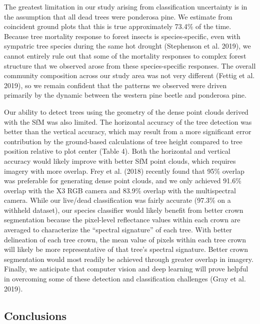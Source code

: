 \documentclass[]{article}
\begin{document}
The greatest limitation in our study arising from classification
uncertainty is in the assumption that all dead trees were ponderosa
pine. We estimate from coincident ground plots that this is true
approximately 73.4\% of the time. Because tree mortality response to
forest insects is species-specific, even with sympatric tree species
during the same hot drought (Stephenson et al. 2019), we cannot entirely
rule out that some of the mortality responses to complex forest
structure that we observed arose from these species-specific responses.
The overall community composition across our study area was not very
different (Fettig et al. 2019), so we remain confident that the patterns
we observed were driven primarily by the dynamic between the western
pine beetle and ponderosa pine.

Our ability to detect trees using the geometry of the dense point clouds
derived with the SfM was also limited. The horizontal accuracy of the
tree detection was better than the vertical accuracy, which may result
from a more significant error contribution by the ground-based
calculations of tree height compared to tree position relative to plot
center (Table 4). Both the horizontal and vertical accuracy would likely
improve with better SfM point clouds, which requires imagery with more
overlap. Frey et al. (2018) recently found that 95\% overlap was
preferable for generating dense point clouds, and we only achieved
91.6\% overlap with the X3 RGB camera and 83.9\% overlap with the
multispectral camera. While our live/dead classification was fairly
accurate (97.3\% on a withheld dataset), our species classifier would
likely benefit from better crown segmentation because the pixel-level
reflectance values within each crown are averaged to characterize the
``spectral signature'' of each tree. With better delineation of each
tree crown, the mean value of pixels within each tree crown will likely
be more representative of that tree's spectral signature. Better crown
segmentation would most readily be achieved through greater overlap in
imagery. Finally, we anticipate that computer vision and deep learning
will prove helpful in overcoming some of these detection and
classification challenges (Gray et al. 2019).

\subsection{Conclusions}\label{conclusions}
\end{document}

